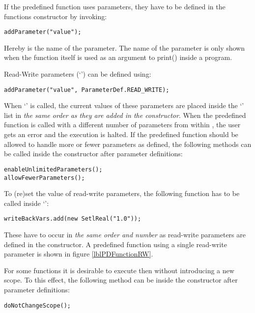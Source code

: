If the predefined function uses parameters, they have to be defined in the functions constructor by invoking:
\begin{lstlisting}[frame=none,numbers=none]
addParameter("value");
\end{lstlisting}

Hereby  is the name of the parameter. The name of the parameter is only shown when the function itself is used as an argument to print() inside a \SetlX{} program.

Read-Write parameters (`') can be defined using:
\begin{lstlisting}[frame=none,numbers=none]
addParameter("value", ParameterDef.READ_WRITE);
\end{lstlisting}

When `' is called, the current values of these parameters are placed inside the `' list in \emph{the same order as they are added in the constructor}. When the predefined function is called with a different number of parameters from within \SetlX{}, the user gets an error and the execution is halted. If the predefined function should be allowed to handle more or fewer parameters as defined, the following methods can be called inside the constructor after parameter definitions:
\begin{lstlisting}[frame=none,numbers=none]
enableUnlimitedParameters();
allowFewerParameters();
\end{lstlisting}

To (re)set the value of read-write parameters, the following function has to be called inside `':
\begin{lstlisting}[frame=none,numbers=none]
writeBackVars.add(new SetlReal("1.0"));
\end{lstlisting}

These have to occur in \emph{the same order and number} as read-write parameters are defined in the constructor. A predefined function using a single read-write parameter is shown in figure \ref{lblPDFunctionRW}.



For some functions it is desirable to execute then without introducing a new scope.
To this effect, the following method can be inside the constructor after parameter definitions:
\begin{lstlisting}[frame=none,numbers=none]
doNotChangeScope();
\end{lstlisting}

